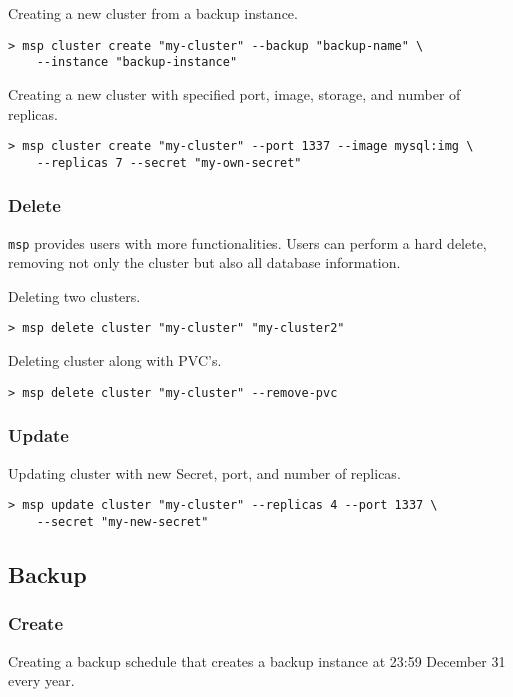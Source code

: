 \noindent Creating a new cluster from a backup instance.

\begin{lstlisting}
> msp cluster create "my-cluster" --backup "backup-name" \
	--instance "backup-instance"
\end{lstlisting}

\noindent Creating a new cluster with specified port, image, storage, and number of replicas.

\begin{lstlisting}
> msp cluster create "my-cluster" --port 1337 --image mysql:img \
	--replicas 7 --secret "my-own-secret"
\end{lstlisting}

\subsubsection*{Delete}

\texttt{msp} provides users with more functionalities.  Users can perform a hard
delete, removing not only the cluster but also all database information.

\noindent Deleting two clusters.

\begin{lstlisting}
> msp delete cluster "my-cluster" "my-cluster2"
\end{lstlisting}

\noindent Deleting cluster along with PVC’s.

\begin{lstlisting}
> msp delete cluster "my-cluster" --remove-pvc
\end{lstlisting}

\subsubsection*{Update}
\noindent Updating cluster with new Secret, port, and number of replicas.

\begin{lstlisting}
> msp update cluster "my-cluster" --replicas 4 --port 1337 \
	--secret "my-new-secret"
\end{lstlisting}

\subsection{Backup}

\subsubsection*{Create}
\noindent Creating a backup schedule that creates a backup instance at 23:59 December 31 every year.

